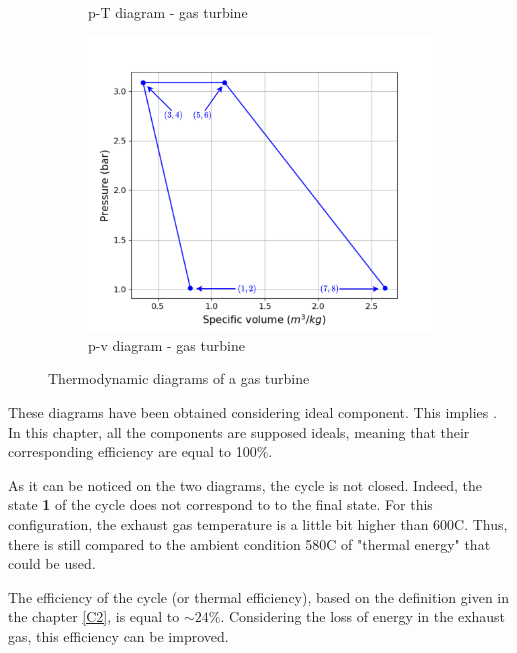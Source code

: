 \begin{figure}[h]
\begin{subfigure}[b]{0.3\textwidth}
         \caption{p-T diagram - gas turbine}
         \label{fig:C5_pT_GT}
     \end{subfigure}
     \begin{subfigure}[b]{0.3\textwidth}
         \centering
         \includegraphics[width=\textwidth]{pv_GT}
         \caption{p-v diagram - gas turbine}
         \label{fig:C5_pv_GT}
     \end{subfigure}
        \caption{Thermodynamic diagrams of a gas turbine}
        \label{fig:C5_thermo_diagram_GT}
\end{figure}

These diagrams have been obtained considering ideal component. This implies
. In this chapter, all the components are supposed ideals, meaning that their corresponding efficiency are equal to 100\%.



As it can be noticed on the two diagrams, the cycle is not closed. Indeed, the state \textbf{1} of the cycle does not correspond to to the final state. For this configuration, the exhaust gas temperature is a little bit higher than 600\degree C. Thus, there is still compared to the ambient condition 580\degree C of "thermal energy" that could be used.

The efficiency of the cycle (or thermal efficiency), based on the definition given in the chapter \ref{C2}, is equal to $\sim 24$\%. Considering the loss of energy in the exhaust gas, this efficiency can be improved.

